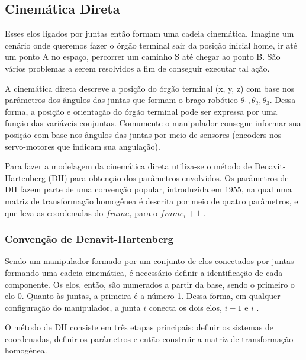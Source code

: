 \subsection{Cinemática Direta}

Esses elos ligados por juntas então formam uma cadeia cinemática. Imagine um cenário onde queremos fazer o órgão terminal sair da posição inicial home, ir até um ponto A no espaço, percorrer um caminho S até chegar ao ponto B. São vários problemas a serem resolvidos a fim de conseguir executar tal ação.

A cinemática direta descreve a posição do órgão terminal (x, y, z) com base nos parâmetros dos ângulos das juntas que formam o braço robótico $\theta_1, \theta_2, \theta_3$. Dessa forma, a posição e orientação do órgão terminal pode ser expressa por uma função das variáveis conjuntas. Comumente o manipulador consegue informar sua posição com base nos ângulos das juntas por meio de sensores (encoders nos servo-motores que indicam sua angulação).

Para fazer a modelagem da cinemática direta utiliza-se o método de Denavit-Hartenberg (DH)  para obtenção dos parâmetros envolvidos. Os parâmetros de DH fazem parte de uma convenção popular, introduzida em 1955, na qual uma matriz de transformação homogênea é descrita por meio de quatro parâmetros, e que leva as coordenadas do $frame_i$ para o $frame_i+1$ \cite{Spong2020}.

\subsubsection{Convenção de Denavit-Hartenberg}

Sendo um manipulador formado por um conjunto de elos conectados por juntas formando uma cadeia cinemática, é necessário definir a identificação de cada componente. Os elos, então, são numerados a partir da base, sendo o primeiro o elo 0. Quanto às juntas, a primeira é a número 1. Dessa forma, em qualquer configuração do manipulador, a junta $i$ conecta os dois elos, $i-1$ e $i$ .

O método de DH consiste em três etapas principais: definir os sistemas de coordenadas, definir os parâmetros e então construir a matriz de transformação homogênea.

